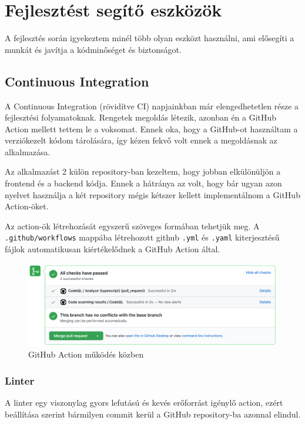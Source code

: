 
\chapter{Fejlesztést segítő eszközök}
A fejlesztés során igyekeztem minél több olyan eszközt használni, ami elősegíti a munkát és javítja a kódminőséget és biztonságot.

\section{Continuous Integration}
A Continuous Integration (rövidítve CI) napjainkban már elengedhetetlen része a fejlesztési folyamatoknak.
Rengetek megoldás létezik, azonban én a GitHub Action mellett tettem le a voksomat.
Ennek oka, hogy a GitHub-ot használtam a verziókezelt kódom tárolására, így kézen fekvő volt ennek a megoldásnak az alkalmazása.

Az alkalmazást 2 külön repository-ban kezeltem, hogy jobban elkülönüljön a frontend és a backend kódja.
Ennek a hátránya az volt, hogy bár ugyan azon nyelvet használja a két repository mégis kétszer kellett implementálnom a GitHub Action-öket.

Az action-ök létrehozását egyszerű szöveges formában tehetjük meg. 
A \lstinline|.github/workflows| mappába létrehozott github \lstinline|.yml| és \lstinline|.yaml| kiterjesztésű fájlok automatikusan kiértékelődnek a GitHub Action által.

\begin{figure}[!ht]
  \centering
  \includegraphics[width=150mm, keepaspectratio]{figures/ci.png}
  \caption{GitHub Action működés közben}
  \label{fig:GitHubAction}
\end{figure}

\subsection{Linter}
A linter egy viszonylag gyors lefutású és kevés erőforrást igénylő action, ezért beállítása szerint bármilyen commit kerül a GitHub repository-ba azonnal elindul.


